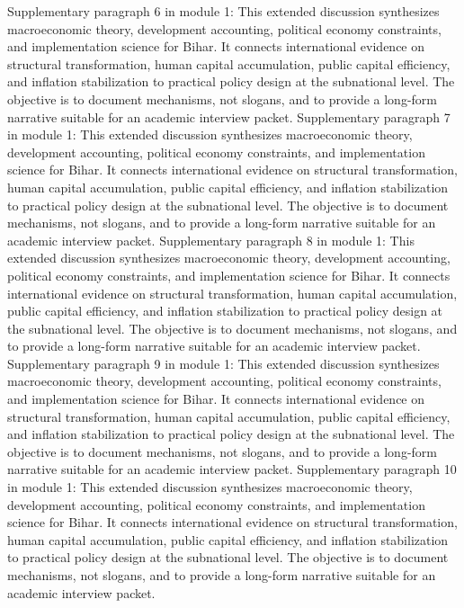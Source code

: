 \documentclass[preprint,12pt]{elsarticle}
\begin{document}
Supplementary paragraph 6 in module 1: This extended discussion synthesizes macroeconomic theory, development accounting, political economy constraints, and implementation science for Bihar. It connects international evidence on structural transformation, human capital accumulation, public capital efficiency, and inflation stabilization to practical policy design at the subnational level. The objective is to document mechanisms, not slogans, and to provide a long-form narrative suitable for an academic interview packet.
Supplementary paragraph 7 in module 1: This extended discussion synthesizes macroeconomic theory, development accounting, political economy constraints, and implementation science for Bihar. It connects international evidence on structural transformation, human capital accumulation, public capital efficiency, and inflation stabilization to practical policy design at the subnational level. The objective is to document mechanisms, not slogans, and to provide a long-form narrative suitable for an academic interview packet.
Supplementary paragraph 8 in module 1: This extended discussion synthesizes macroeconomic theory, development accounting, political economy constraints, and implementation science for Bihar. It connects international evidence on structural transformation, human capital accumulation, public capital efficiency, and inflation stabilization to practical policy design at the subnational level. The objective is to document mechanisms, not slogans, and to provide a long-form narrative suitable for an academic interview packet.
Supplementary paragraph 9 in module 1: This extended discussion synthesizes macroeconomic theory, development accounting, political economy constraints, and implementation science for Bihar. It connects international evidence on structural transformation, human capital accumulation, public capital efficiency, and inflation stabilization to practical policy design at the subnational level. The objective is to document mechanisms, not slogans, and to provide a long-form narrative suitable for an academic interview packet.
Supplementary paragraph 10 in module 1: This extended discussion synthesizes macroeconomic theory, development accounting, political economy constraints, and implementation science for Bihar. It connects international evidence on structural transformation, human capital accumulation, public capital efficiency, and inflation stabilization to practical policy design at the subnational level. The objective is to document mechanisms, not slogans, and to provide a long-form narrative suitable for an academic interview packet.
\end{document}
